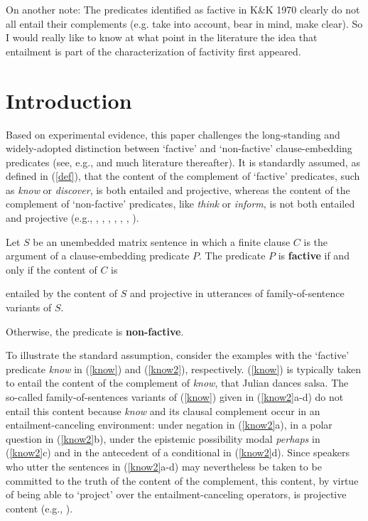 \documentclass[11pt,fleqn]{article}
\newcommand{\6}{\mbox{$[\hspace*{-.6mm}[$}}
\newcommand{\9}{\mbox{$]\hspace*{-.6mm}]$}}
\begin{document}
On another note: The predicates identified as factive in K&K 1970 clearly do not all entail their complements (e.g. take into account, bear in mind, make clear). So I would really like to know at what point in the literature the idea that entailment is part of the characterization of factivity first appeared.
			
\section{Introduction}\label{s1}

Based on experimental evidence, this paper challenges the long-standing and widely-adopted distinction between `factive' and `non-factive' clause-embedding predicates (see, e.g.,\citealt{karttunen71b,kiparsky-kiparsky71} and much literature thereafter). It is standardly assumed, as defined in (\ref{def}), that the content of the complement of `factive' predicates, such as {\em know} or {\em discover}, is both entailed and projective, whereas the content of the complement of `non-factive' predicates, like {\em think} or {\em inform},  is not both entailed and projective (e.g., \citealt[119-123]{gazdar79a}, \citealt[355]{ccmg90}, \citealt[345]{vds92},  \citealt[3]{abbott06}, \citealt[139]{schlenker10}, \citealt[77]{anand-hacquard2014}, \citealt[fn.7]{spector-egre2015}).

\begin{exe}
\ex\label{def} Let $S$ be an unembedded matrix sentence in which a finite clause $C$ is the argument of a clause-embedding predicate $P$. The predicate $P$ is {\bf factive} if and only if the content of $C$ is

\begin{xlist}
\ex entailed by the content of $S$ and
\ex projective in utterances of family-of-sentence variants of $S$.
\end{xlist}
Otherwise, the predicate is {\bf non-factive}.
\end{exe}

To illustrate the standard assumption, consider the examples with the `factive' predicate {\em know} in  (\ref{know}) and (\ref{know2}), respectively. (\ref{know}) is typically taken to entail the content of the complement of {\em know}, that Julian dances salsa. The so-called family-of-sentences variants of (\ref{know}) given in (\ref{know2}a-d) do not entail this content because {\em know} and its clausal complement occur in an entailment-canceling environment: under negation in (\ref{know2}a), in a polar question in (\ref{know2}b), under the epistemic possibility modal {\em perhaps} in (\ref{know2}c) and in the antecedent of a conditional in (\ref{know2}d). Since speakers who utter the sentences in (\ref{know2}a-d) may nevertheless be taken to be committed to the truth of the content of the complement, this content, by virtue of being able to `project' over the entailment-canceling operators, is projective content (e.g., \citealt{potts05,brst-salt10}). 
\end{document}
